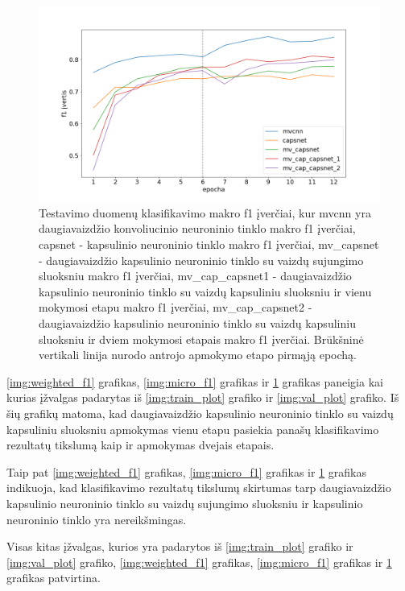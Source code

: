 \begin{figure}[H]
	\centering
	\includegraphics[scale=0.4]{img/macro.png}
	\caption{
		Testavimo duomenų klasifikavimo makro f1 įverčiai, kur mvcnn yra daugiavaizdžio konvoliucinio neuroninio tinklo makro f1 įverčiai, capsnet - kapsulinio neuroninio tinklo makro f1 įverčiai, mv\_capsnet - daugiavaizdžio kapsulinio neuroninio tinklo su vaizdų sujungimo sluoksniu makro f1 įverčiai, mv\_cap\_capsnet1 - daugiavaizdžio kapsulinio neuroninio tinklo su vaizdų kapsuliniu sluoksniu ir vienu mokymosi etapu makro f1 įverčiai, mv\_cap\_capsnet2 - daugiavaizdžio kapsulinio neuroninio tinklo su vaizdų kapsuliniu sluoksniu ir dviem mokymosi etapais makro f1 įverčiai. Brūkšninė vertikali linija nurodo antrojo apmokymo etapo pirmąją epochą.
	}
	\label{img:macro_f1}
\end{figure}

\ref{img:weighted_f1} grafikas, \ref{img:micro_f1} grafikas ir \ref{img:macro_f1} grafikas paneigia kai kurias įžvalgas padarytas iš \ref{img:train_plot} grafiko ir \ref{img:val_plot} grafiko. Iš šių grafikų matoma, kad daugiavaizdžio kapsulinio neuroninio tinklo su vaizdų kapsuliniu sluoksniu apmokymas vienu etapu pasiekia panašų klasifikavimo rezultatų tikslumą kaip ir apmokymas dvejais etapais.

Taip pat \ref{img:weighted_f1} grafikas, \ref{img:micro_f1} grafikas ir \ref{img:macro_f1} grafikas indikuoja, kad klasifikavimo rezultatų tikslumų skirtumas tarp daugiavaizdžio kapsulinio neuroninio tinklo su vaizdų sujungimo sluoksniu ir kapsulinio neuroninio tinklo yra nereikšmingas.

Visas kitas įžvalgas, kurios yra padarytos iš \ref{img:train_plot} grafiko ir \ref{img:val_plot} grafiko, \ref{img:weighted_f1} grafikas, \ref{img:micro_f1} grafikas ir \ref{img:macro_f1} grafikas patvirtina.

